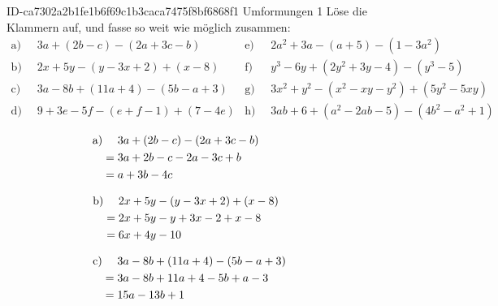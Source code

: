 \begin{exercise}
      {ID-ca7302a2b1fe1b6f69c1b3caca7475f8bf6868f1}
      {Umformungen 1}
  \newcommand{\gap}{\;\;}%
  \ifproblem\problem
    Löse die Klammern auf, und fasse so weit wie möglich zusammen:
    \begin{align*}
      \text{a)}\gap & 3a+(2b-c)-(2a+3c-b) &
      \text{e)}\gap & 2a^2+3a-(a+5)-(1-3a^2)
      \\
      \text{b)}\gap & 2x+5y-(y-3x+2)+(x-8) &
      \text{f)}\gap & y^3-6y+(2y^2+3y-4)-(y^3-5)
      \\
      \text{c)}\gap & 3a-8b+(11a+4)-(5b-a+3) &
      \text{g)}\gap & 3x^2+y^2-(x^2-xy-y^2)+(5y^2-5xy)
      \\
      \text{d)}\gap & 9+3e-5f-(e+f-1)+(7-4e) &
      \text{h)}\gap & 3ab+6+(a^2-2ab-5)-(4b^2-a^2+1)
    \end{align*}
  \fi
  \ifoutcome\outcome
    \newcommand{\toprow}[1]
    {%
      \makebox[20em][l]
      {%
        \ensuremath
        {%
          \displaystyle
          \phantom{\,=\:\,}%
          #1%
        }%
      }%
    }%
    \begin{minipage}[t]{0.49\textwidth}
      \small
      \begin{equation*}
        \begin{split}
          \text{a)} &\toprow{3a+(2b-c)-(2a+3c-b)} \\
                    &=       3a+2b-c-2a-3c+b      \\
                    &=       a+3b-4c
        \end{split}
      \end{equation*}

      \begin{equation*}
        \begin{split}
          \text{b)} &\toprow{2x+5y-(y-3x+2)+(x-8)} \\
                    &=       2x+5y-y+3x-2+x-8      \\
                    &=       6x+4y-10
        \end{split}
      \end{equation*}

      \begin{equation*}
        \begin{split}
          \text{c)} &\toprow{3a-8b+(11a+4)-(5b-a+3)} \\
                    &=     3a-8b+11a+4-5b+a-3        \\
                    &=     15a-13b+1
        \end{split}
      \end{equation*}


\end{minipage}
\end{exercise}
